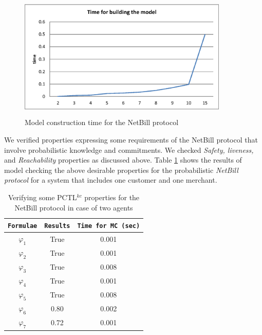 \begin{figure}%
\begin{center}
\includegraphics[width=10cm,height=6cm]{chap4/img/time-for-building-model.eps}
\caption{Model construction time for the NetBill protocol} \label{Building the model-cha4}
\end{center}
\end{figure}


We verified properties expressing some requirements of the NetBill
protocol that involve probabilistic knowledge and commitments. We
checked \emph{Safety, liveness,} and \emph{Reachability}
properties as discussed above. Table \ref{formulae-PRISM-results-cha4} shows the results of model checking the above desirable properties for the
probabilistic \emph{NetBill protocol} for a system that includes
one customer and one merchant.


\begin{table}%
\centering \caption{Verifying some PCTL$^{kc}$ properties for the NetBill protocol in case of two agents} \label{formulae-PRISM-results-cha4}
\begin{tabular}{|c|c|c|}
\hline
\texttt{Formulae}    & \texttt{Results} & \texttt{Time for MC (sec)} \\
\hline\hline
$\varphi_1$                &True           &  0.001     \\
\hline
$\varphi_2$               &True           &  0.001     \\
\hline
$\varphi_3$                &True           & 0.008    \\
\hline
$\varphi_4$                &True          & 0.001   \\
\hline
$\varphi_5$                &True           &  0.008  \\
\hline
$\varphi_6$                &0.80           &  0.002  \\
\hline
$\varphi_7$                &0.72           &  0.001  \\
\hline

\end{tabular}
\end{table}

